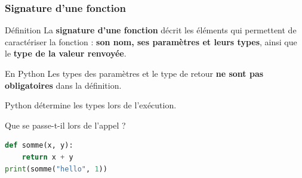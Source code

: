 \documentclass[10pt]{beamer}
\begin{document}
\begin{frame}[containsverbatim]
	\frametitle{Signature d'une fonction}
	
	\begin{block}{Définition}
		La \textbf{signature d'une fonction} décrit les éléments
		qui permettent de caractériser la fonction :
		\textbf{son nom, ses paramètres et leurs types},
		ainsi que le \textbf{type de la valeur renvoyée}.
	\end{block}
	
	\vspace{0.2cm}
	
	\begin{alertblock}{En Python}
		Les types des paramètres et le type de retour
		\textbf{ne sont pas obligatoires} dans la définition.
		
		\medskip
		
		Python détermine les types lors de l'exécution.
	\end{alertblock}
	
	\vspace{0.15cm}
	
	\begin{exampleblock}{Que se passe-t-il lors de l'appel ?}
		\begin{lstlisting}[language=Python]
def somme(x, y):
	return x + y
print(somme("hello", 1))
\end{lstlisting}
		

	\end{exampleblock}

	
\end{frame}
\end{document}
